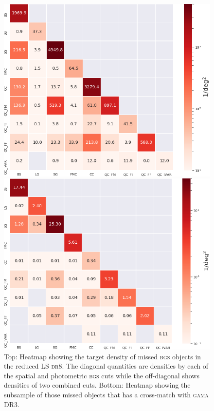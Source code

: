 \documentclass[fleqn,usenatbib]{mnras}
\newcommand{\BGS}{\textsc{bgs}\xspace}
\newcommand{\DReight}{\textsc{dr8}\xspace}
\newcommand{\GAMA}{\textsc{gama}\xspace}
\begin{document}
\begin{figure}
	\includegraphics[width=\columnwidth]{images/bgs_rejs_heatmap}
	
	\vspace{1cm}
	
	\includegraphics[width=\columnwidth]{images/bgs_rejs_gama_heatmap}
    \caption{Top: Heatmap showing the target density of missed \BGS objects in the reduced LS \DReight. The diagonal quantities are densities by each of the spatial and photometric \BGS cuts while the off-diagonal shows densities of two combined cuts. Bottom: Heatmap showing the subsample of those missed objects that has a cross-match with \GAMA DR3.}
    \label{fig:heatmaps}
\end{figure}
\end{document}
